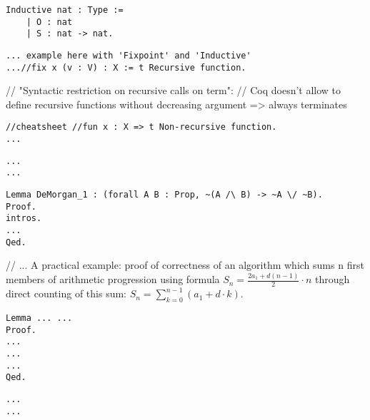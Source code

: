 \documentclass[article]{aaltoseries}
\begin{document}
\begin{lstlisting}
Inductive nat : Type :=
	| O : nat
	| S : nat -> nat.
\end{lstlisting}

\begin{lstlisting}[caption={Recursive function definition: factorial}]
... example here with 'Fixpoint' and 'Inductive'
...//fix x (v : V) : X := t Recursive function.
\end{lstlisting}
// "Syntactic restriction on recursive calls on term":
// Coq doesn't allow to define recursive functions without decreasing argument => always terminates

\begin{lstlisting}[caption={Non-recursive function definition: factorial}]
//cheatsheet //fun x : X => t Non-recursive function.
...
\end{lstlisting}

\begin{lstlisting}[caption={Inductive data type definition: ???}]
...
...
\end{lstlisting}

	\begin{lstlisting}[caption={Propositional logic proof: de Morgan's law}]
Lemma DeMorgan_1 : (forall A B : Prop, ~(A /\ B) -> ~A \/ ~B).
Proof.
intros.
...
Qed.
\end{lstlisting}

// ... A practical example: proof of correctness of an algorithm which sums n first members of arithmetic progression using formula $S_{n} = { {\frac {2 a_{1} + d (n - 1)}{2} \cdot n}}$ through direct counting of this sum: $S_{n} = \sum\limits_{k=0}^{n-1} (a_{1} + d \cdot k)$.
\begin{lstlisting}[caption={First-order logic proof: formula of the sum of n first members of arithmetic progression}]
Lemma ... ... 
Proof.
...
...
...
Qed.
\end{lstlisting}



\begin{lstlisting}[caption={Recursive function definition: factorial}]
...
...
\end{lstlisting}
\end{document}
